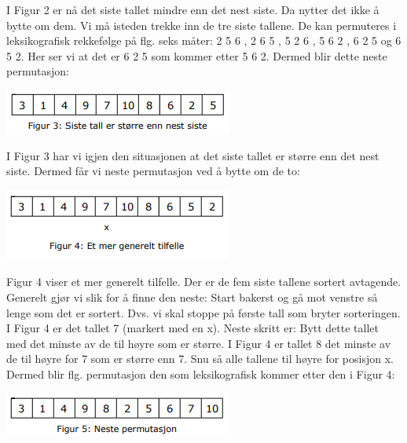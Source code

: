 \documentclass[11pt]{article}
\begin{document}
        \begin{multicols}{2}
            I Figur 2 er nå det siste tallet mindre enn det nest siste. Da nytter det ikke å bytte om dem.
            Vi må isteden trekke inn de tre siste tallene. De kan permuteres i leksikografisk rekkefølge på
            flg. seks måter: 2 5 6 , 2 6 5 , 5 2 6 , 5 6 2 , 6 2 5 og 6 5 2. Her ser vi at det er 6 2 5
            som kommer etter 5 6 2. Dermed blir dette neste permutasjon:

            \columnbreak

            \includegraphics[center]{f-1.3.1-3.png}

        \end{multicols}

        \begin{multicols}{2}
            I Figur 3 har vi igjen den situasjonen at det siste tallet er større enn det nest siste. Dermed
            får vi neste permutasjon ved å bytte om de to:

            \columnbreak

            \includegraphics[center]{f-1.3.1-4.png}

        \end{multicols}

        Figur 4 viser et mer generelt tilfelle. Der er de fem siste tallene sortert avtagende. Generelt
        gjør vi slik for å finne den neste: Start bakerst og gå mot venstre så lenge som det er
        sortert. Dvs. vi skal stoppe på første tall som bryter sorteringen. I Figur 4 er det tallet 7
        (markert med en x). Neste skritt er: Bytt dette tallet med det minste av de til høyre
        som er større. I Figur 4 er tallet 8 det minste av de til høyre for 7 som er større enn 7. Snu
        så alle tallene til høyre for posisjon x. Dermed blir flg. permutasjon den som
        leksikografisk kommer etter den i Figur 4:

        \includegraphics[center]{f-1.3.1-5.png}
\end{document}
